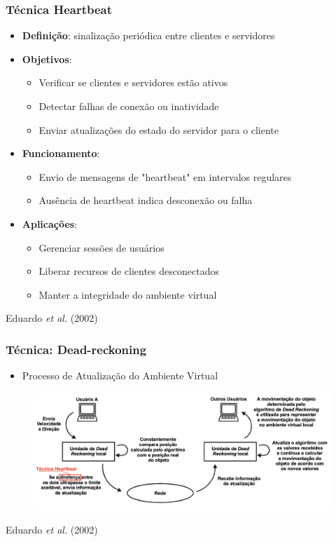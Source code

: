 \documentclass{beamer}
\begin{document}
\begin{frame}
  \frametitle{Técnica Heartbeat}
  \begin{itemize}
    \item \textbf{Definição}: sinalização periódica entre clientes e servidores
    \item \textbf{Objetivos}:
    \begin{itemize}
      \item Verificar se clientes e servidores estão ativos
      \item Detectar falhas de conexão ou inatividade
      \item Enviar atualizações do estado do servidor para o cliente
    \end{itemize}
    \item \textbf{Funcionamento}:
    \begin{itemize}
      \item Envio de mensagens de "heartbeat" em intervalos regulares
      \item Ausência de heartbeat indica desconexão ou falha
    \end{itemize}
    \item \textbf{Aplicações}:
    \begin{itemize}
      \item Gerenciar sessões de usuários
      \item Liberar recursos de clientes desconectados
      \item Manter a integridade do ambiente virtual
    \end{itemize}
  \end{itemize}
  \begin{flushright}
    \scriptsize
    Eduardo \textit{et al.} (2002)
  \end{flushright}
\end{frame}

\begin{frame}
  \frametitle{Técnica: Dead-reckoning}
  \begin{itemize}
    \item Processo de Atualização do Ambiente Virtual
  \end{itemize}
  \begin{figure}[h]
    \centering
    \vspace{-18pt}
    \includegraphics[width=1.03\textwidth]{imagem_Deadreckoning.png}
    \vspace{-20pt}
  \end{figure}
  \begin{flushright}
    \scriptsize
    Eduardo \textit{et al.} (2002)
  \end{flushright}
\end{frame}
\end{document}
